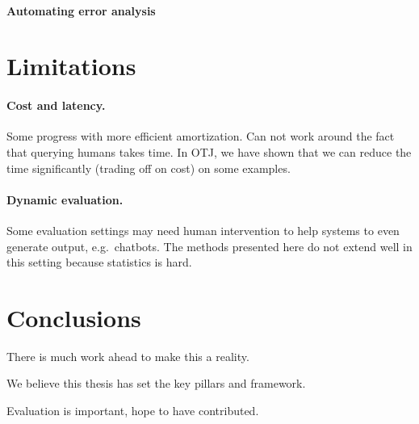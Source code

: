 \paragraph{Automating error analysis}

\section{Limitations}

\paragraph{Cost and latency.}
Some progress with more efficient amortization.
Can not work around the fact that querying humans takes time. In OTJ, we have shown that we can reduce the time significantly (trading off on cost) on some examples.

\paragraph{Dynamic evaluation.}
Some evaluation settings may need human intervention to help systems to even generate output, e.g.\ chatbots.
The methods presented here do not extend well in this setting because statistics is hard.

\section{Conclusions}
There is much work ahead to make this a reality.

We believe this thesis has set the key pillars and framework.

Evaluation is important, hope to have contributed.

